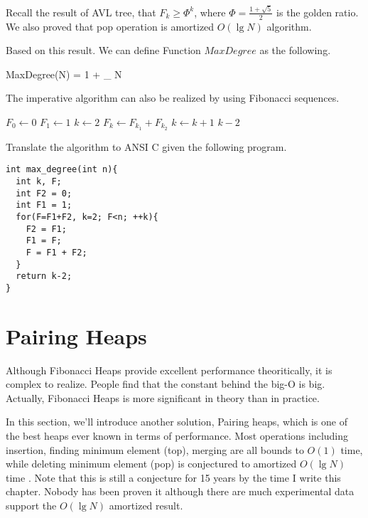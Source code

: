 \documentclass{article}
\begin{document}
Recall the result of AVL tree, that $F_k \geq \Phi^k$, where
$\Phi = \frac{1+\sqrt{5}}{2}$ is the golden ratio. We also proved
that pop operation is amortized $O(\lg N)$ algorithm.

Based on this result. We can define Function $MaxDegree$ as the following.

\be
  MaxDegree(N) = 1 + \lfloor \log_{\Phi} N \rfloor
\ee

The imperative  algorithm can also be realized by 
using Fibonacci sequences.

\begin{algorithmic}
  \State $F_0 \gets 0$
  \State $F_1 \gets 1$
  \State $k \gets 2$
  \Repeat
    \State $F_k \gets F_{k_1} + F_{k_2}$
    \State $k \gets k+1$
  \State \Return $k-2$
\EndFunction
\end{algorithmic}

Translate the algorithm to ANSI C given the following program.

\lstset{language=C}
\begin{lstlisting}
int max_degree(int n){
  int k, F;
  int F2 = 0; 
  int F1 = 1;
  for(F=F1+F2, k=2; F<n; ++k){
    F2 = F1;
    F1 = F;
    F = F1 + F2;
  }
  return k-2;
}
\end{lstlisting}


\section{Pairing Heaps}
\label{pairing-heap}
Although Fibonacci Heaps provide excellent performance theoritically,
it is complex to realize. People find that the constant behind the
big-O is big. Actually, Fibonacci Heaps is more significant in theory
than in practice.

In this section, we'll introduce another solution, Pairing heaps,
which is one of the best heaps ever known in terms of performance. 
Most operations including insertion, finding minimum element (top), 
merging are all bounds to $O(1)$ time, while deleting minimum element (pop)
is conjectured to amortized $O(\lg N)$ time \cite{pairing-heap} 
\cite{okasaki-book}. Note that this is still
a conjecture for 15 years by the time I write this chapter. Nobody has been 
proven it although there are much experimental data support the
$O(\lg N)$ amortized result.
\end{document}
